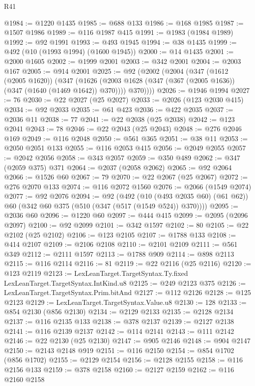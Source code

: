 \begin{lexlean}{R41}
\begin{coremodule}
@1984 := @1220 @1435
@1985 := @688 @133
@1986 := @168 @1985
@1987 := @1507 @1986
@1989 := @116 @1987 @415
@1991 := @1983 (@1984 @1989)
@1992 := @92 @1991
@1993 := @493 @1945
@1994 := @38 @1435
@1999 := @492 (@10 (@1993 @1994) (@1600 @1945))
@2000 := @14 @1435
@2001 := @2000 @1605
@2002 := @1999 @2001
@2003 := @342 @2001
@2004 := @2003 @167
@2005 := @914 @2001
@2025 := @92
    (@2002
      (@2004
        (@347
          (@1612 (@2005 @1620))
          (@347
            (@1626 (@2003 @1628 (@347 (@367 (@2005 @1636)) (@347 (@1640 (@1469 @1642)) @370))))
            @370))))
@2026 := @1946 @1994
@2027 := 76
@2030 := @22 @2027 (@25 @2027)
@2033 := @2026 (@123 @2030 @415)
@2034 := @92 @2033
@2035 := @61 @423
@2036 := @422 @2035
@2037 := @2036 @11
@2038 := 77
@2041 := @22 @2038 (@25 @2038)
@2042 := @123 @2041
@2043 := 78
@2046 := @22 @2043 (@25 @2043)
@2048 := @276 @2046 @169
@2049 := @116 @2048
@2050 := @561 @365
@2051 := @38 @11
@2053 := @2050 @2051 @133
@2055 := @116 @2053 @415
@2056 := @2049 @2055
@2057 := @2042 @2056
@2058 := @343 @2057
@2059 := @350 @489
@2062 := @347 (@2059 @375) @371
@2064 := @2037 (@2058 @2062)
@2065 := @92 @2064
@2066 := @1526 @60
@2067 := 79
@2070 := @22 @2067 (@25 @2067)
@2072 := @276 @2070 @133
@2074 := @116 @2072 @1560
@2076 := @2066 (@1549 @2074)
@2077 := @92 @2076
@2094 := @92
    (@492
      (@10 (@493 @2035 @60) (@61 @62))
      @60
      (@342 @60 @375 (@510 (@347 (@517 (@1549 @524)) @370))))
@2095 := @2036 @60
@2096 := @1220 @60
@2097 := @444 @415
@2099 := @2095 (@2096 @2097)
@2100 := @92 @2099
@2101 := @342 @1597
@2102 := 80
@2105 := @22 @2102 (@25 @2102)
@2106 := @123 @2105
@2107 := @1788 @133
@2108 := @414 @2107
@2109 := @2106 @2108
@2110 := @2101 @2109
@2111 := @561 @349
@2112 := @2111 @1597
@2113 := @1788 @909
@2114 := @898 @2113
@2115 := @116 @2114
@2116 := 81
@2119 := @22 @2116 (@25 @2116)
@2120 := @123 @2119
@2123 := LexLeanTarget.TargetSyntax.Ty.fixed LexLeanTarget.TargetSyntax.IntKind.u8
@2125 := @249 @2123 @375
@2126 := LexLeanTarget.TargetSyntax.Prim.bitAnd
@2127 := @112 @2126
@2128 := @125 @2123
@2129 := LexLeanTarget.TargetSyntax.Value.u8
@2130 := 128
@2133 := @854 @2130 (@856 @2130)
@2134 := @2129 @2133
@2135 := @2128 @2134
@2137 := @116 @2135 @133
@2138 := @378 @2137
@2139 := @2127 @2138
@2141 := @116 @2139 @2137
@2142 := @114 @2141
@2143 := @111 @2142
@2146 := @22 @2130 (@25 @2130)
@2147 := @905 @2146
@2148 := @904 @2147
@2150 := @2143 @2148 @919
@2151 := @116 @2150
@2154 := @854 @1702 (@856 @1702)
@2155 := @2129 @2154
@2156 := @2128 @2155
@2158 := @116 @2156 @133
@2159 := @378 @2158
@2160 := @2127 @2159
@2162 := @116 @2160 @2158

\end{coremodule}
\end{lexlean}
